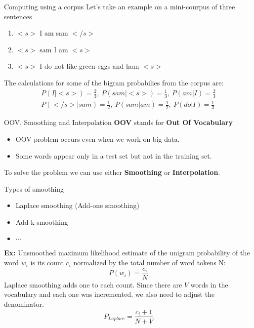 \documentclass{beamer}
\begin{document}
\begin{frame}{Computing using a corpus}
    Let's take an example on a mini-courpus of three sentences\\
    \begin{enumerate}
        \item $<s>$ I am sam $</s>$
        \item $<s>$ sam I am $<s>$
        \item  $<s>$ I do not like green eggs and ham $<s>$
    \end{enumerate}
    The calculations for some of the bigram probabilies from the corpus are:
    \begin{align*}
        P(I|<s>)=\frac{2}{3},\ P(sam|<s>)=\frac{1}{3},\ P(am|I)=\frac{2}{3}\\
        P(</s>|sam)=\frac{1}{2},\ P(sam|am)=\frac{1}{2},\ P(do|I)=\frac{1}{3}
    \end{align*}
\end{frame}

\begin{frame}{OOV, Smoothing and Interpolation}
    \textbf{OOV} stands for \textbf{Out Of Vocabulary}\\
    \begin{itemize}
        \item OOV problem occurs even when we work on big data.
        \item Some words appear only in a test set but not in the training set.
    \end{itemize}
    To solve the problem we can use either \textbf{Smoothing} or \textbf{Interpolation}.
\end{frame}

\begin{frame}{Types of smoothing}
    \begin{itemize}
        \item Laplace smoothing (Add-one smoothing)
        \item Add-k smoothing
        \item $\cdots$
    \end{itemize}
    \textbf{Ex: }Unsmoothed maximum likelihood estimate of the unigram probability of the word $w_i$ is its count $c_i$ normalized by the total number of word tokens N:\\
    $$P(w_i)=\frac{c_i}{N}$$
    Laplace smoothing adds one to each count. Since there are $V$ words in the vocabulary and each one was incremented, we also need to adjust the denominator.\\
    $$P_{Laplace}=\frac{c_i+1}{N+V}$$
\end{frame}
\end{document}
